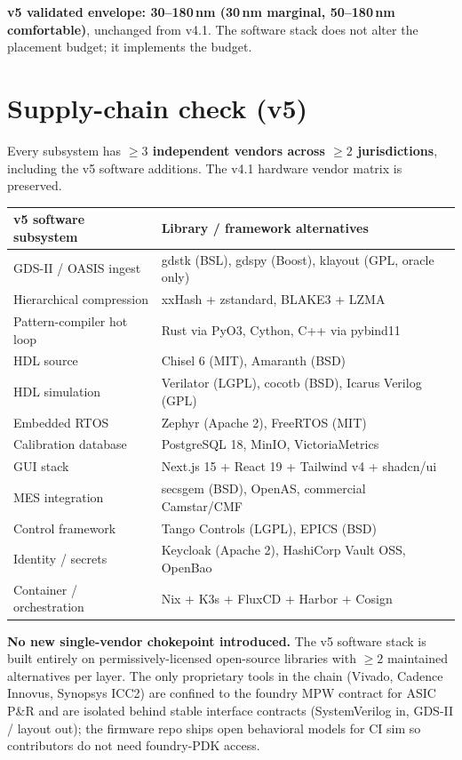 \documentclass[11pt,letterpaper]{article}
\begin{document}
\textbf{v5 validated envelope: 30--180\,nm (30\,nm marginal, 50--180\,nm comfortable)}, unchanged from v4.1. The software stack does not alter the placement budget; it implements the budget.

\clearpage
\section{Supply-chain check (v5)}

Every subsystem has \textbf{$\geq 3$ independent vendors across $\geq 2$ jurisdictions}, including the v5 software additions. The v4.1 hardware vendor matrix is preserved.

\begin{center}
\begin{tabular}{ll}
\toprule
v5 software subsystem & Library / framework alternatives \\
\midrule
GDS-II / OASIS ingest & gdstk (BSL), gdspy (Boost), klayout (GPL, oracle only) \\
Hierarchical compression & xxHash + zstandard, BLAKE3 + LZMA \\
Pattern-compiler hot loop & Rust via PyO3, Cython, C++ via pybind11 \\
HDL source & Chisel 6 (MIT), Amaranth (BSD) \\
HDL simulation & Verilator (LGPL), cocotb (BSD), Icarus Verilog (GPL) \\
Embedded RTOS & Zephyr (Apache 2), FreeRTOS (MIT) \\
Calibration database & PostgreSQL 18, MinIO, VictoriaMetrics \\
GUI stack & Next.js 15 + React 19 + Tailwind v4 + shadcn/ui \\
MES integration & secsgem (BSD), OpenAS, commercial Camstar/CMF \\
Control framework & Tango Controls (LGPL), EPICS (BSD) \\
Identity / secrets & Keycloak (Apache 2), HashiCorp Vault OSS, OpenBao \\
Container / orchestration & Nix + K3s + FluxCD + Harbor + Cosign \\
\bottomrule
\end{tabular}
\end{center}

\textbf{No new single-vendor chokepoint introduced.} The v5 software stack is built entirely on permissively-licensed open-source libraries with $\geq 2$ maintained alternatives per layer. The only proprietary tools in the chain (Vivado, Cadence Innovus, Synopsys ICC2) are confined to the foundry MPW contract for ASIC P\&R and are isolated behind stable interface contracts (SystemVerilog in, GDS-II / layout out); the firmware repo ships open behavioral models for CI sim so contributors do not need foundry-PDK access.
\end{document}
